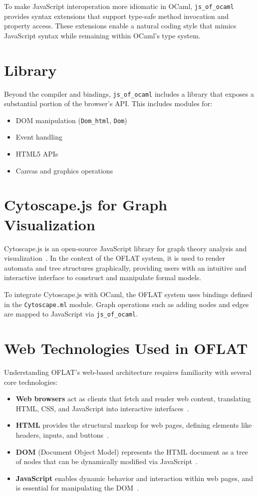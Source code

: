 To make JavaScript interoperation more idiomatic in OCaml, 
\texttt{js\_of\_ocaml} provides syntax extensions that support type-safe method invocation and property access. 
These extensions enable a natural coding style that mimics JavaScript syntax while remaining within OCaml's type system.

\section*{Library}

Beyond the compiler and bindings, \texttt{js\_of\_ocaml} includes a library that exposes a substantial portion of the browser's API. 
This includes modules for:
\begin{itemize}
  \item DOM manipulation (\texttt{Dom\_html}, \texttt{Dom})
  \item Event handling
  \item HTML5 APIs
  \item Canvas and graphics operations
\end{itemize}


\section{Cytoscape.js for Graph Visualization}

Cytoscape.js is an open-source JavaScript library for graph theory analysis and visualization~\cite{cytoscape}. 
In the context of the OFLAT system, it is used to render automata and tree structures graphically, 
providing users with an intuitive and interactive interface to construct and manipulate formal models. 

To integrate Cytoscape.js with OCaml, the OFLAT system uses bindings defined in the \texttt{Cytoscape.ml} module. 
Graph operations such as adding nodes and edges are mapped to JavaScript via \texttt{js\_of\_ocaml}.

\section{Web Technologies Used in OFLAT}

Understanding OFLAT's web-based architecture requires familiarity with several core technologies:
\begin{itemize}
    \item \textbf{Web browsers} act as clients that fetch and render web content, translating HTML, CSS, and JavaScript into interactive interfaces~\cite{webbrowsers}.
    \item \textbf{HTML} provides the structural markup for web pages, defining elements like headers, inputs, and buttons~\cite{html}.
    \item \textbf{DOM} (Document Object Model) represents the HTML document as a tree of nodes that can be dynamically modified via JavaScript~\cite{dom}.
    \item \textbf{JavaScript} enables dynamic behavior and interaction within web pages, and is essential for manipulating the DOM~\cite{javascript}.
\end{itemize}


